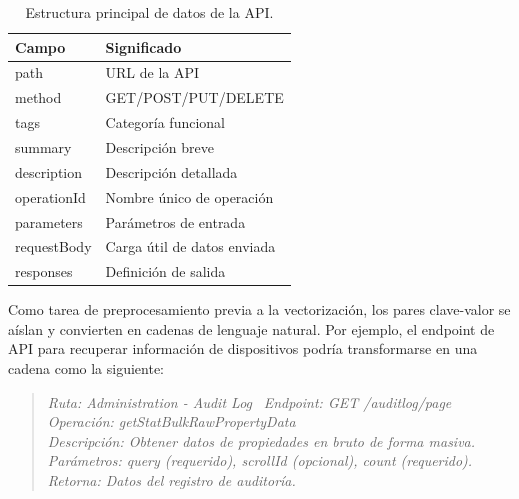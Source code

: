 \documentclass[11pt, a4paper]{article}
\begin{document}
\begin{table}[h]
    \centering
    \begin{tabular}{|l|p{9cm}|}
        \hline
        \textbf{Campo} & \textbf{Significado} \\
        \hline
        path & URL de la API \\
        \hline
        method & GET/POST/PUT/DELETE \\
        \hline
        tags & Categoría funcional \\
        \hline
        summary & Descripción breve \\
        \hline
        description & Descripción detallada \\
        \hline
        operationId & Nombre único de operación \\
        \hline
        parameters & Parámetros de entrada \\
        \hline
        requestBody & Carga útil de datos enviada\\
        \hline
        responses & Definición de salida \\
        \hline
    \end{tabular}
    \caption{Estructura principal de datos de la API.}
    \label{tab:openapi-fields}
\end{table}

Como tarea de preprocesamiento previa a la vectorización, los pares clave-valor se aíslan y convierten en cadenas de lenguaje natural. Por ejemplo, el endpoint de API para recuperar información de dispositivos podría transformarse en una cadena como la siguiente:

\begin{quote}
\textit{Ruta: Administration - Audit Log} \ \textit{Endpoint: GET /auditlog/page}\\
\textit{Operación: getStatBulkRawPropertyData}\\
\textit{Descripción: Obtener datos de propiedades en bruto de forma masiva.}\\
\textit{Parámetros: query (requerido), scrollId (opcional), count (requerido).}\\
\textit{Retorna: Datos del registro de auditoría.}
\end{quote}
\end{document}
